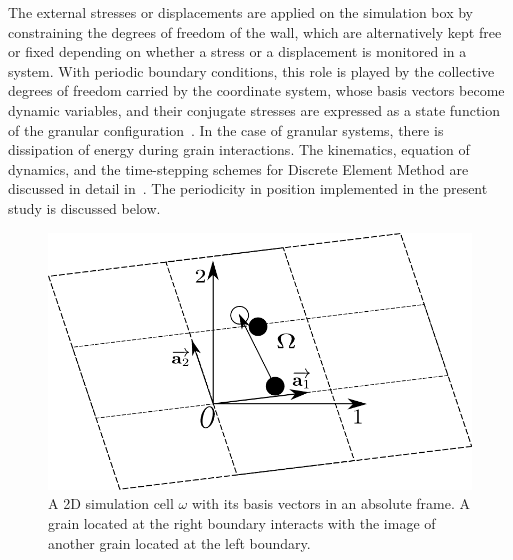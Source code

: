 The external stresses or displacements are applied on the simulation box by 
constraining the 
degrees of freedom of the wall, which are alternatively kept free or fixed 
depending on whether a 
stress or a displacement is monitored in a system. With periodic boundary 
conditions, this role is 
played by the collective degrees of freedom carried by the coordinate system, 
whose basis vectors 
become dynamic variables, and their conjugate stresses are expressed as a state 
function of the 
granular configuration~\citep{Par1980}. In the case of granular systems, there 
is dissipation of 
energy during grain interactions. The kinematics, equation of dynamics, and 
the time-stepping 
schemes for Discrete Element Method are discussed in detail 
in~\citet{Voiv2011}. The periodicity 
in 
position implemented in the present study is discussed below. 
\begin{figure}[htbp]
\centering
\includegraphics[scale=0.65]{periodic}
\caption[A 2D simulation cell $\omega$ with its basis vectors in an absolute 
frame]{A 2D 
simulation 
cell $\omega$ with its basis vectors in an absolute frame. A grain located 
at the right 
boundary 
interacts with the image of another grain located at the left boundary.}
\label{fig:periodic}
\end{figure}

